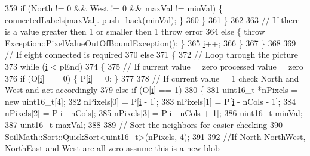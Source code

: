 \begin{DoxyCode}
359                         \textcolor{keywordflow}{if} (North != 0 && West != 0 && maxVal != minVal) \{ connectedLabels[maxVal].
      push\_back(minVal); \}
360                     \}
361                 \}
362 
363                 \textcolor{comment}{// If there is a value greater then 1 or smaller then 1 throw error}
364                 \textcolor{keywordflow}{else} \{ \textcolor{keywordflow}{throw} Exception::PixelValueOutOfBoundException(); \}
365                 \hyperlink{_comparision_pictures_2_createtest_image_8m_a6f6ccfcf58b31cb6412107d9d5281426}{i}++;
366             \}
367         \}
368 
369         \textcolor{comment}{// If eight connected is required}
370         \textcolor{keywordflow}{else}
371         \{
372             \textcolor{comment}{// Loop through the picture}
373             \textcolor{keywordflow}{while} (\hyperlink{_comparision_pictures_2_createtest_image_8m_a6f6ccfcf58b31cb6412107d9d5281426}{i} < pEnd)
374             \{
375                 \textcolor{comment}{// If current value = zero processed value = zero}
376                 \textcolor{keywordflow}{if} (O[\hyperlink{_comparision_pictures_2_createtest_image_8m_a6f6ccfcf58b31cb6412107d9d5281426}{i}] == 0) \{ P[\hyperlink{_comparision_pictures_2_createtest_image_8m_a6f6ccfcf58b31cb6412107d9d5281426}{i}] = 0; \}
377 
378                 \textcolor{comment}{// If current value = 1 check North and West and act accordingly}
379                 \textcolor{keywordflow}{else} \textcolor{keywordflow}{if} (O[\hyperlink{_comparision_pictures_2_createtest_image_8m_a6f6ccfcf58b31cb6412107d9d5281426}{i}] == 1)
380                 \{
381                     uint16\_t *nPixels = \textcolor{keyword}{new} uint16\_t[4];
382                     nPixels[0] = P[\hyperlink{_comparision_pictures_2_createtest_image_8m_a6f6ccfcf58b31cb6412107d9d5281426}{i} - 1];
383                     nPixels[1] = P[\hyperlink{_comparision_pictures_2_createtest_image_8m_a6f6ccfcf58b31cb6412107d9d5281426}{i} - nCols - 1];
384                     nPixels[2] = P[\hyperlink{_comparision_pictures_2_createtest_image_8m_a6f6ccfcf58b31cb6412107d9d5281426}{i} - nCols];
385                     nPixels[3] = P[\hyperlink{_comparision_pictures_2_createtest_image_8m_a6f6ccfcf58b31cb6412107d9d5281426}{i} - nCols + 1];
386                     uint16\_t minVal;
387                     uint16\_t maxVal;
388 
389                     \textcolor{comment}{// Sort the neighbors for easier checking}
390                     SoilMath::Sort::QuickSort<uint16\_t>(nPixels, 4);
391 
392                     \textcolor{comment}{//If North NorthWest, NorthEast and West are all zero assume this is a new blob}

\end{DoxyCode}
